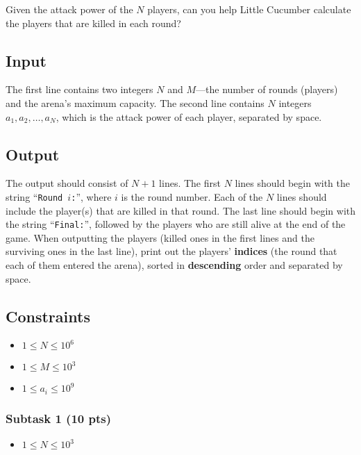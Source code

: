 \noindent Given the attack power of the $N$ players, can you help Little Cucumber calculate the players that are killed in each round?

\subsection{Input}\label{input}

The first line contains two integers $N$ and $M$---the number of rounds (players) and the arena's maximum capacity. 
The second line contains $N$ integers $a_1, a_2, \dots, a_N$,  which is the attack power of each player, separated by space.

\subsection{Output}\label{output}

The output should consist of $N+1$ lines. The first $N$ lines should begin with the string ``\texttt{Round $i$:}'', where $i$ is the round number. Each of the $N$ lines should include the player(s) that are killed in that round. The last line should begin with the string ``\texttt{Final:}'', followed by the players who are still alive at the end of the game. When outputting the players (killed ones in the first lines and the surviving ones in the last line), print out the players' \textbf{indices} (the round that each of them entered the arena), sorted in \textbf{descending} order and separated by space.

\subsection{Constraints} \label{constraint}
\begin{itemize}
\tightlist
    \item $1 \le N \le 10^6$
    \item $1 \le M \le 10^3$
    \item $1 \le a_i \le 10^9$
\end{itemize}

\subsubsection{Subtask 1 (10 pts)}\label{subtask-1}

\begin{itemize}
\tightlist
\item $1 \le N \le 10^3$
\end{itemize}

